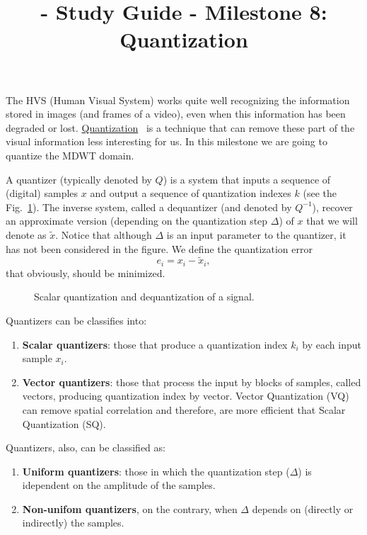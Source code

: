 
\title{\SM{} - Study Guide - Milestone 8: Quantization}

\maketitle

The HVS (Human Visual System) works quite well recognizing the
information stored in images (and frames of a video), even when this
information has been degraded or
lost. \href{https://en.wikipedia.org/wiki/Quantization_(signal_processing)}{Quantization}~\cite{sayood2017introduction,vetterli2014foundations}
is a technique that can remove these part of the visual information
less interesting for us. In this milestone we are going to quantize
the MDWT domain.

A quantizer (typically denoted by $Q$) is a system that inputs a
sequence of (digital) samples $x$ and output a sequence of
quantization indexes $k$ (see the Fig.~\ref{fig:Q}). The inverse
system, called a dequantizer (and denoted by $Q^{-1}$), recover an
approximate version (depending on the quantization step $\Delta$) of
$x$ that we will denote as $\tilde{x}$. Notice that although $\Delta$
is an input parameter to the quantizer, it has not been considered in
the figure. We define the quantization error
\begin{equation}
  e_i = x_i - \tilde{x}_i,
\end{equation}
that obviously, should be minimized.

\begin{figure}
  \centering
  \caption{Scalar quantization and dequantization of a signal.}
  \label{fig:Q}
\end{figure}

Quantizers can be classifies into:
\begin{enumerate}
\item \textbf{Scalar quantizers}: those that produce a quantization
  index $k_i$ by each input sample $x_i$.
\item \textbf{Vector quantizers}: those that process the input by
  blocks of samples, called vectors, producing quantization index by
  vector. Vector Quantization (VQ) can remove spatial correlation and
  therefore, are more efficient that Scalar Quantization (SQ).
\end{enumerate}

Quantizers, also, can be classified as:
\begin{enumerate}
\item \textbf{Uniform quantizers}: those in which the quantization
  step ($\Delta$) is idependent on the amplitude of the samples.
\item \textbf{Non-unifom quantizers}, on the contrary, when $\Delta$
  depends on (directly or indirectly) the samples.
\end{enumerate}

